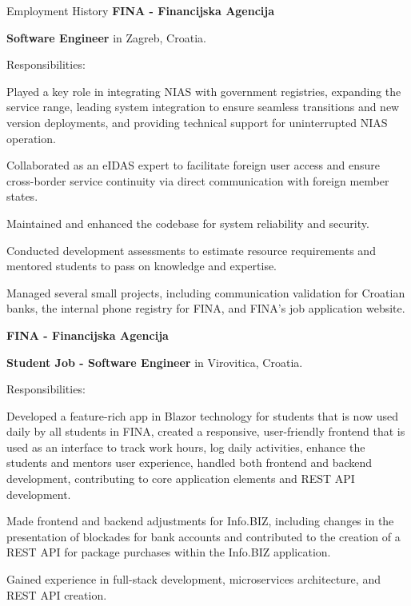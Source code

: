 \begin{rubric}{Employment History}
	\textbf{FINA - Financijska Agencija} \par
	\textbf{Software Engineer} in Zagreb, Croatia.
	\par Responsibilities:
	\begin{list}{}{\leftmargin=0pt \itemindent=1em}
		\item Played a key role in integrating NIAS with government registries, expanding the service range, leading system integration to ensure seamless transitions and new version deployments, and providing technical support for uninterrupted NIAS operation.
		\item Collaborated as an eIDAS expert to facilitate foreign user access and ensure cross-border service continuity via direct communication with foreign member states.
		\item Maintained and enhanced the codebase for system reliability and security.
		\item Conducted development assessments to estimate resource requirements and mentored students to pass on knowledge and expertise.
		\item Managed several small projects, including communication validation for Croatian banks, the internal phone registry for FINA, and FINA's job application website.
	\end{list}
	\textbf{FINA - Financijska Agencija} \par
	\textbf{Student Job - Software Engineer} in Virovitica, Croatia.
	\par Responsibilities:
	\begin{list}{}{\leftmargin=0pt \itemindent=1em}
		\item Developed a feature-rich app in Blazor technology for students that is now used daily by all students in FINA, created a responsive, user-friendly frontend that is used as an interface to track work hours, log daily activities, enhance the students and mentors user experience,  handled both frontend and backend development, contributing to core application elements and REST API development.
		\item Made frontend and backend adjustments for Info.BIZ, including changes in the presentation of blockades for bank accounts and contributed to the creation of a REST API for package purchases within the Info.BIZ application.
		\item Gained experience in full-stack development, microservices architecture, and REST API creation.
	\end{list}
\end{rubric}